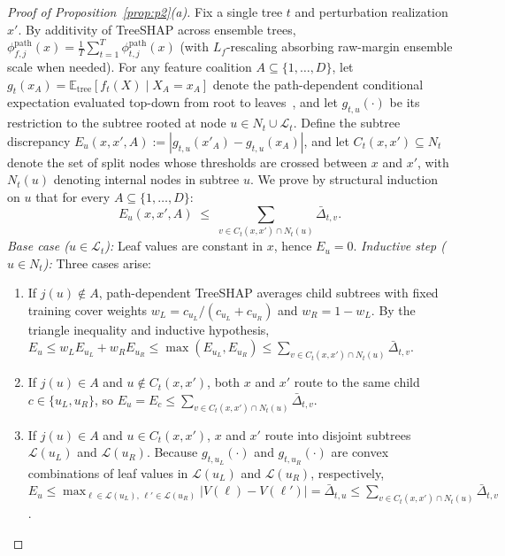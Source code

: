 \documentclass[conference]{IEEEtran}
\begin{document}
\begin{proof}[Proof of Proposition~\ref{prop:p2}(a)]
Fix a single tree $t$ and perturbation realization $x'$. By additivity of TreeSHAP across ensemble trees, $\phi_{f,j}^{\mathrm{path}}(x) = \frac{1}{T}\sum_{t=1}^T \phi_{t,j}^{\mathrm{path}}(x)$ (with $L_f$-rescaling absorbing raw-margin ensemble scale when needed). For any feature coalition $A \subseteq \{1,\dots,D\}$, let $g_t(x_A) = \mathbb{E}_{\mathrm{tree}}[f_t(X) \mid X_A = x_A]$ denote the path-dependent conditional expectation evaluated top-down from root to leaves~\cite{lundberg2020}, and let $g_{t,u}(\cdot)$ be its restriction to the subtree rooted at node $u \in N_t \cup \mathcal{L}_t$. Define the subtree discrepancy $E_u(x, x', A) := |g_{t,u}(x'_A) - g_{t,u}(x_A)|$, and let $C_t(x, x') \subseteq N_t$ denote the set of split nodes whose thresholds are crossed between $x$ and $x'$, with $N_t(u)$ denoting internal nodes in subtree $u$. We prove by structural induction on $u$ that for every $A \subseteq \{1,\dots,D\}$:
\begin{equation}
\label{eq:p2_ind}
E_u(x, x', A) \;\le\; \sum_{v \in C_t(x, x') \cap N_t(u)} \bar{\Delta}_{t,v}.
\end{equation}
\textit{Base case ($u \in \mathcal{L}_t$):} Leaf values are constant in $x$, hence $E_u = 0$. \textit{Inductive step ($u \in N_t$):} Three cases arise:
\begin{enumerate}
    \item If $j(u) \notin A$, path-dependent TreeSHAP averages child subtrees with fixed training cover weights $w_L = c_{u_L}/(c_{u_L}+c_{u_R})$ and $w_R = 1 - w_L$. By the triangle inequality and inductive hypothesis, $E_u \le w_L E_{u_L} + w_R E_{u_R} \le \max(E_{u_L}, E_{u_R}) \le \sum_{v \in C_t(x,x')\cap N_t(u)} \bar{\Delta}_{t,v}$.
    \item If $j(u) \in A$ and $u \notin C_t(x,x')$, both $x$ and $x'$ route to the same child $c \in \{u_L, u_R\}$, so $E_u = E_c \le \sum_{v \in C_t(x,x')\cap N_t(u)} \bar{\Delta}_{t,v}$.
    \item If $j(u) \in A$ and $u \in C_t(x,x')$, $x$ and $x'$ route into disjoint subtrees $\mathcal{L}(u_L)$ and $\mathcal{L}(u_R)$. Because $g_{t,u_L}(\cdot)$ and $g_{t,u_R}(\cdot)$ are convex combinations of leaf values in $\mathcal{L}(u_L)$ and $\mathcal{L}(u_R)$, respectively, $E_u \le \max_{\ell \in \mathcal{L}(u_L),\, \ell' \in \mathcal{L}(u_R)} |V(\ell) - V(\ell')| = \bar{\Delta}_{t,u} \le \sum_{v \in C_t(x,x')\cap N_t(u)} \bar{\Delta}_{t,v}$.
\end{enumerate}

\end{proof}
\end{document}
